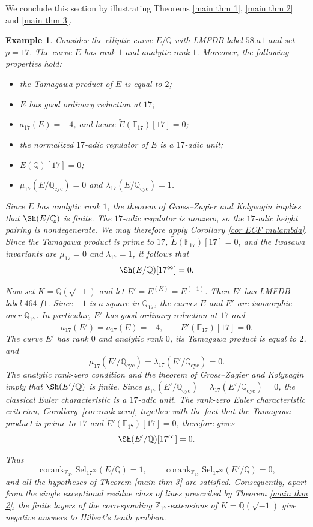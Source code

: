 \documentclass[12pt]{amsart}
\newtheorem{example}[theorem]{Example}
\newcommand{\Z}{\mathbb{Z}}
\newcommand{\Q}{\mathbb{Q}}
\newcommand{\F}{\mathbb{F}}
\newcommand{\Sel}{\mathrm{Sel}}
\newcommand{\op}[1]{\operatorname{#1}}
\numberwithin{equation}{section}
\begin{document}
\par We conclude this section by illustrating Theorems \ref{main thm 1}, \ref{main thm 2} and \ref{main thm 3}.
\begin{example}\label{example 4.15}
Consider the elliptic curve $E/\Q$ with LMFDB label $58.a1$ and set
$p=17$. The curve $E$ has rank $1$ and analytic rank $1$. Moreover,
the following properties hold:
\begin{itemize}
    \item the Tamagawa product of $E$ is equal to $2$;
    \item $E$ has good ordinary reduction at $17$;
    \item $a_{17}(E)=-4$, and hence
    $\widetilde{E}(\F_{17})[17]=0$;
    \item the normalized $17$-adic regulator of $E$ is a
    $17$-adic unit;
    \item $E(\Q)[17]=0$;
    \item
    $\mu_{17}(E/\Q_{\op{cyc}})=0$ and
    $\lambda_{17}(E/\Q_{\op{cyc}})=1$.
\end{itemize}

Since $E$ has analytic rank $1$, the theorem of Gross--Zagier and
Kolyvagin implies that $\Sh(E/\Q)$ is finite. The $17$-adic regulator
is nonzero, so the $17$-adic height pairing is nondegenerate. We may
therefore apply Corollary \ref{cor ECF mulambda}. Since the Tamagawa
product is prime to $17$, $\widetilde{E}(\F_{17})[17]=0$, and the
Iwasawa invariants are $\mu_{17}=0$ and $\lambda_{17}=1$, it follows
that
\[
        \Sh(E/\Q)[17^\infty]=0.
\]

Now set $K=\Q(\sqrt{-1})$ and let
$E'=E^{(K)}=E^{(-1)}$. Then $E'$ has LMFDB label $464.f1$.
Since $-1$ is a square in $\Q_{17}$, the curves $E$ and $E'$ are
isomorphic over $\Q_{17}$. In particular, $E'$ has good ordinary
reduction at $17$ and
\[
        a_{17}(E')=a_{17}(E)=-4,
        \qquad
        \widetilde{E}'(\F_{17})[17]=0.
\]
The curve $E'$ has rank $0$ and analytic rank $0$, its Tamagawa
product is equal to $2$, and
\[
        \mu_{17}(E'/\Q_{\op{cyc}})
        =
        \lambda_{17}(E'/\Q_{\op{cyc}})
        =0.
\]
The analytic rank-zero condition and the theorem of Gross--Zagier and
Kolyvagin imply that $\Sh(E'/\Q)$ is finite. Since
$\mu_{17}(E'/\Q_{\op{cyc}})
=\lambda_{17}(E'/\Q_{\op{cyc}})=0$, the classical Euler
characteristic is a $17$-adic unit. The rank-zero Euler characteristic
criterion, Corollary~\ref{cor:rank-zero}, together with the fact that
the Tamagawa product is prime to $17$ and
$\widetilde{E}'(\F_{17})[17]=0$, therefore gives
\[
        \Sh(E'/\Q)[17^\infty]=0.
\]

Thus
\[
 \op{corank}_{\Z_{17}}\Sel_{17^\infty}(E/\Q)=1,
 \qquad
 \op{corank}_{\Z_{17}}\Sel_{17^\infty}(E'/\Q)=0,
\]
and all the hypotheses of Theorem \ref{main thm 3} are satisfied.
Consequently, apart from the single exceptional residue class of
lines prescribed by Theorem \ref{main thm 2}, the finite layers of
the corresponding $\Z_{17}$-extensions of
$K=\Q(\sqrt{-1})$ give negative answers to Hilbert's tenth problem.
\end{example}
\end{document}
